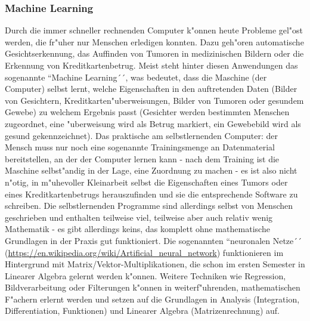 \subsubsection{Machine Learning}
Durch die immer schneller rechnenden Computer k"onnen heute Probleme gel"ost werden, die fr"uher nur Menschen erledigen konnten. Dazu geh"oren automatische Gesichtserkennung, das Auffinden von Tumoren in medizinischen Bildern oder die Erkennung von Kreditkartenbetrug. Meist steht hinter diesen Anwendungen das sogenannte ``Machine Learning´´, was bedeutet, dass die Maschine (der Computer) selbst lernt, welche Eigenschaften in den auftretenden Daten (Bilder von Gesichtern, Kreditkarten"uberweisungen, Bilder von Tumoren oder gesundem Gewebe) zu welchem Ergebnis passt (Gesichter werden bestimmten Menschen zugeordnet, eine "uberweisung wird als Betrug markiert, ein Gewebebild wird als gesund gekennzeichnet). Das praktische am selbstlernenden Computer: der Mensch muss nur noch eine sogenannte Trainingsmenge an Datenmaterial bereitstellen, an der der Computer lernen kann - nach dem Training ist die Maschine selbst"andig in der Lage, eine Zuordnung zu machen - es ist also nicht n"otig, in m"uhevoller Kleinarbeit selbst die Eigenschaften eines Tumors oder eines Kreditkartenbetrugs herauszufinden und sie die entsprechende Software zu schreiben.
Die selbstlernenden Programme sind allerdings selbst von Menschen geschrieben und enthalten teilweise viel, teilweise aber auch relativ wenig Mathematik - es gibt allerdings keins, das komplett ohne mathematische Grundlagen in der Praxis gut funktioniert. Die sogenannten ``neuronalen Netze´´ (\url{https://en.wikipedia.org/wiki/Artificial_neural_network}) funktionieren im Hintergrund mit Matrix/Vektor-Multiplikationen, die schon im ersten Semester in Linearer Algebra gelernt werden k"onnen. Weitere Techniken wie Regression, Bildverarbeitung oder Filterungen k"onnen in weiterf"uhrenden, mathematischen F"achern erlernt werden und setzen auf die Grundlagen in Analysis (Integration, Differentiation, Funktionen) und Linearer Algebra (Matrizenrechnung) auf.